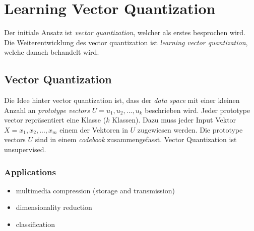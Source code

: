 \section{Learning Vector Quantization}
\label{sect:learning-vector-quantization}
Der initiale Ansatz ist \textit{vector quantization}, welcher als erstes besprochen wird. Die Weiterentwicklung des vector quantization ist \textit{learning vector quantization}, welche danach behandelt wird.

\subsection{Vector Quantization}
\label{ssect:vector-quantization}
Die Idee hinter vector quantization ist, dass der \textit{data space} mit einer kleinen Anzahl an \textit{prototype vectors} $U = u_1, u_2, ..., u_k$ beschrieben wird. Jeder prototype vector repräsentiert eine Klasse ($k$ Klassen). Dazu muss jeder Input Vektor $X = x_1, x_2, ..., x_m$ einem der Vektoren in $U$ zugewiesen werden. Die prototype vectors $U$ sind in einem \textit{codebook} zusammengefasst. Vector Quantization ist unsupervised.

\subsubsection{Applications}
\label{sssect:vq-application}
\begin{itemize}
	\item multimedia compression (storage and transmission)
	\item dimensionality reduction
	\item classification
\end{itemize}

